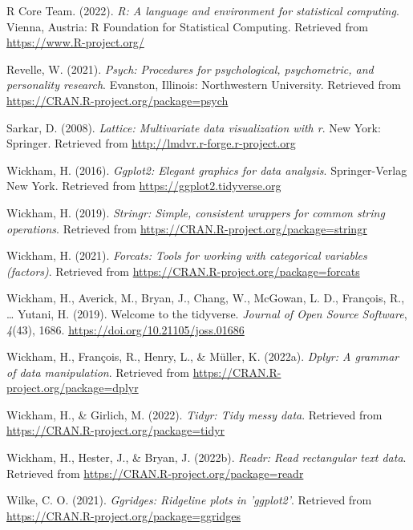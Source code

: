 \documentclass[
  english,
  man]{apa6}
\begin{document}
\leavevmode\hypertarget{ref-R-base}{}%
R Core Team. (2022). \emph{R: A language and environment for statistical computing}. Vienna, Austria: R Foundation for Statistical Computing. Retrieved from \url{https://www.R-project.org/}

\leavevmode\hypertarget{ref-R-psych}{}%
Revelle, W. (2021). \emph{Psych: Procedures for psychological, psychometric, and personality research}. Evanston, Illinois: Northwestern University. Retrieved from \url{https://CRAN.R-project.org/package=psych}

\leavevmode\hypertarget{ref-R-lattice}{}%
Sarkar, D. (2008). \emph{Lattice: Multivariate data visualization with r}. New York: Springer. Retrieved from \url{http://lmdvr.r-forge.r-project.org}

\leavevmode\hypertarget{ref-R-ggplot2}{}%
Wickham, H. (2016). \emph{Ggplot2: Elegant graphics for data analysis}. Springer-Verlag New York. Retrieved from \url{https://ggplot2.tidyverse.org}

\leavevmode\hypertarget{ref-R-stringr}{}%
Wickham, H. (2019). \emph{Stringr: Simple, consistent wrappers for common string operations}. Retrieved from \url{https://CRAN.R-project.org/package=stringr}

\leavevmode\hypertarget{ref-R-forcats}{}%
Wickham, H. (2021). \emph{Forcats: Tools for working with categorical variables (factors)}. Retrieved from \url{https://CRAN.R-project.org/package=forcats}

\leavevmode\hypertarget{ref-R-tidyverse}{}%
Wickham, H., Averick, M., Bryan, J., Chang, W., McGowan, L. D., François, R., \ldots{} Yutani, H. (2019). Welcome to the tidyverse. \emph{Journal of Open Source Software}, \emph{4}(43), 1686. \url{https://doi.org/10.21105/joss.01686}

\leavevmode\hypertarget{ref-R-dplyr}{}%
Wickham, H., François, R., Henry, L., \& Müller, K. (2022a). \emph{Dplyr: A grammar of data manipulation}. Retrieved from \url{https://CRAN.R-project.org/package=dplyr}

\leavevmode\hypertarget{ref-R-tidyr}{}%
Wickham, H., \& Girlich, M. (2022). \emph{Tidyr: Tidy messy data}. Retrieved from \url{https://CRAN.R-project.org/package=tidyr}

\leavevmode\hypertarget{ref-R-readr}{}%
Wickham, H., Hester, J., \& Bryan, J. (2022b). \emph{Readr: Read rectangular text data}. Retrieved from \url{https://CRAN.R-project.org/package=readr}

\leavevmode\hypertarget{ref-R-ggridges}{}%
Wilke, C. O. (2021). \emph{Ggridges: Ridgeline plots in 'ggplot2'}. Retrieved from \url{https://CRAN.R-project.org/package=ggridges}

\endgroup
\end{document}
